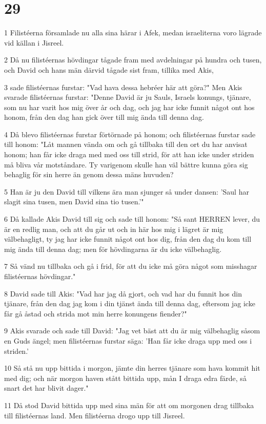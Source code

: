 \chapter{29}

\par 1 Filistéerna församlade nu alla sina härar i Afek, medan israeliterna voro lägrade vid källan i Jisreel.
\par 2 Då nu filistéernas hövdingar tågade fram med avdelningar på hundra och tusen, och David och hans män därvid tågade sist fram, tillika med Akis,
\par 3 sade filistéernas furstar: "Vad hava dessa hebréer här att göra?" Men Akis svarade filistéernas furstar: "Denne David är ju Sauls, Israels konungs, tjänare, som nu har varit hos mig över år och dag, och jag har icke funnit något ont hos honom, från den dag han gick över till mig ända till denna dag.
\par 4 Då blevo filistéernas furstar förtörnade på honom; och filistéernas furstar sade till honom: "Låt mannen vända om och gå tillbaka till den ort du har anvisat honom; han får icke draga med med oss till strid, för att han icke under striden må bliva vår motståndare. Ty varigenom skulle han väl bättre kunna göra sig behaglig för sin herre än genom dessa mäns huvuden?
\par 5 Han är ju den David till vilkens ära man sjunger så under dansen: 'Saul har slagit sina tusen, men David sina tio tusen.'"
\par 6 Då kallade Akis David till sig och sade till honom: "Så sant HERREN lever, du är en redlig man, och att du går ut och in här hos mig i lägret är mig välbehagligt, ty jag har icke funnit något ont hos dig, från den dag du kom till mig ända till denna dag; men för hövdingarna är du icke välbehaglig.
\par 7 Så vänd nu tillbaka och gå i frid, för att du icke må göra något som misshagar filistéernas hövdingar."
\par 8 David sade till Akis: "Vad har jag då gjort, och vad har du funnit hos din tjänare, från den dag jag kom i din tjänst ända till denna dag, eftersom jag icke får gå åstad och strida mot min herre konungens fiender?"
\par 9 Akis svarade och sade till David: "Jag vet bäst att du är mig välbehaglig såsom en Guds ängel; men filistéernas furstar säga: 'Han får icke draga upp med oss i striden.'
\par 10 Så stå nu upp bittida i morgon, jämte din herres tjänare som hava kommit hit med dig; och när morgon haven stått bittida upp, mån I draga edra färde, så snart det har blivit dager."
\par 11 Då stod David bittida upp med sina män för att om morgonen drag tillbaka till filistéernas land. Men filistéerna drogo upp till Jisreel.

